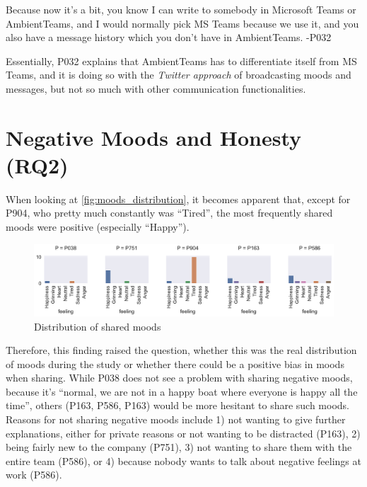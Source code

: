 \begin{displayquote}
    Because now it's a bit, you know I can write to somebody in Microsoft Teams or AmbientTeams, and I would normally pick MS Teams because we use it, and you also have a message history which you don't have in AmbientTeams. -P032
\end{displayquote}

Essentially, P032 explains that AmbientTeams has to differentiate itself from MS Teams, and it is doing so with the \textit{Twitter approach} of broadcasting moods and messages, but not so much with other communication functionalities.

\section{Negative Moods and Honesty (RQ2)}
\label{section:negative_moods_and_honesty}

When looking at \autoref{fig:moods_distribution}, it becomes apparent that, except for P904, who pretty much constantly was \enquote{Tired}, the most frequently shared moods were positive (especially \enquote{Happy}).

\begin{figure}[h]
    \centering
    \includegraphics[width=\linewidth]{plots/moods_distribution.pdf}
    \caption{Distribution of shared moods }
    \label{fig:moods_distribution}
\end{figure}

Therefore, this finding raised the question, whether this was the real distribution of moods during the study or whether there could be a positive bias in moods when sharing. While P038 does not see a problem with sharing negative moods, because it's \enquote{normal, we are not in a happy boat where everyone is happy all the time}, others (P163, P586, P163) would be more hesitant to share such moods. Reasons for not sharing negative moods include 1) not wanting to give further explanations, either for private reasons or not wanting to be distracted (P163), 2) being fairly new to the company (P751), 3) not wanting to share them with the entire team (P586), or 4) because nobody wants to talk about negative feelings at work (P586).

